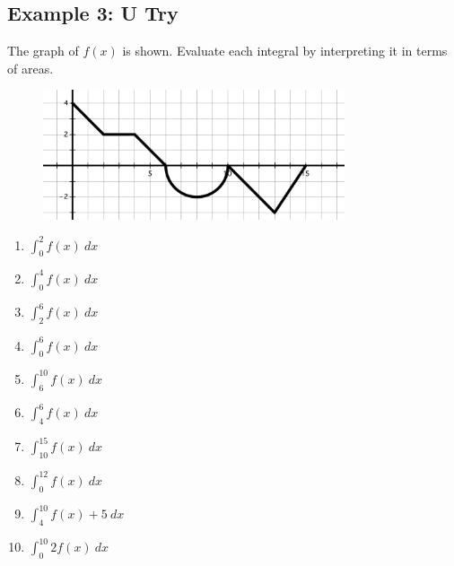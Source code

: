 \documentclass[10pt]{book}
\theoremstyle{definition}
\begin{document}
\subsection*{Example 3: U Try}
The graph of $f(x)$ is shown. Evaluate each integral by interpreting it in terms of areas.
\begin{figure}[h!]
    \centering
    \includegraphics[width=3.5in]{signedareaEx2.png}
\end{figure}
\begin{multicols}{2}
    \begin{enumerate}[label=(\alph*)]
        \item $\displaystyle\int_0^2 f(x)\ dx$\vspace{1.5cm}
        \item $\displaystyle\int_0^4 f(x)\ dx$\vspace{1.5cm} \item $\displaystyle\int_2^6 f(x)\ dx$\vspace{1.5cm}
        \item $\displaystyle\int_0^6 f(x)\ dx$\vspace{1.5cm}
        \item $\displaystyle\int_6^{10} f(x)\ dx$\vspace{1.5cm}
        \item $\displaystyle\int_4^6 f(x)\ dx$\vspace{1.5cm}
        \item $\displaystyle\int_{10}^{15} f(x)\ dx$\vspace{1.5cm}
        \item $\displaystyle\int_0^{12} f(x)\ dx$\vspace{1.5cm}
        \item $\displaystyle\int_4^{10} f(x)+5\ dx$\vspace{1.5cm}
        \item $\displaystyle\int_0^{10} 2f(x)\ dx$\vspace{1.5cm}
    \end{enumerate}
    \end{multicols}
\end{document}
